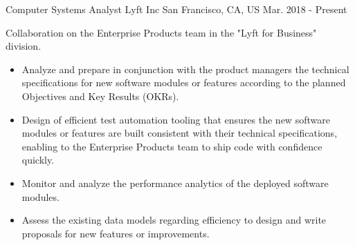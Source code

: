 


\begin{cventries}
	
	
	\cventry
	{Computer Systems Analyst} %
	{Lyft Inc} %
	{San Francisco, CA, US} %
	{Mar. 2018 - Present} %
	{ %
		\begin{cvitems}
			\item {Collaboration on the Enterprise Products team in the "Lyft for Business" division.}
			\begin{itemize}
				\item {Analyze and prepare in conjunction with the product managers the technical specifications for new software modules or features according to the planned Objectives and Key Results (OKRs).}
				\item{Design of efficient test automation tooling that ensures the new software modules or features are built consistent with their technical specifications, enabling to the Enterprise Products team to ship code with confidence quickly.}
				\item {Monitor and analyze the performance analytics of the deployed software modules.}
				\item {Assess the existing data models regarding efficiency to design and write proposals for new features or improvements.}
			\end{itemize}
		\end{cvitems}
	}
		
	

\end{cventries}
